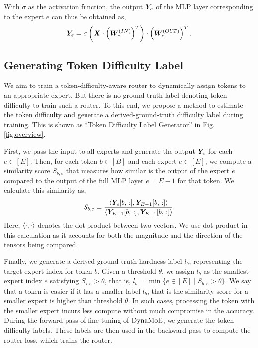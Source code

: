 With $\sigma$ as the activation function, the output $\bm{Y}_e$ of the MLP layer corresponding to the expert $e$ can thus be obtained as, 
\begin{equation}\label{eq:expert}
    \bm{Y}_e = \sigma \left(  \bm{X} \cdot \left(  \bm{W}^{(IN)}_e \right)^T   \right) \cdot \left(  \bm{W}^{(OUT)}_e \right)^T.
\end{equation}





\subsection{Generating Token Difficulty Label}\label{subsec:generate_gt_label}


We aim to train a token-difficulty-aware router to dynamically assign tokens to an appropriate expert. But there is no ground-truth label denoting token difficulty to train such a router. To this end, we propose a method to estimate the token difficulty and generate a derived-ground-truth difficulty label during training. This is shown  as ``Token Difficulty Label Generator'' in Fig. \ref{fig:overview}. 

First, we pass the input to all experts and generate the output $\bm{Y}_e$ for each $e \in [E]$. Then, for each token $b \in [B]$ and each expert $e \in [E]$, we compute a similarity score $S_{b,e}$ that measures how similar is the output of the expert $e$ compared to the output of the full MLP layer $e={E-1}$ for that token. We calculate this similarity as,
\begin{equation}
    S_{b,e} = \frac{\left< \bm{Y}_e[b,\,:], \bm{Y}_{E-1}[b,\,:] \right>}{\left< \bm{Y}_{E-1}[b,\,:], \bm{Y}_{E-1}[b,\,:] \right>}.
\end{equation}
Here, $\left< \cdot, \cdot \right>$ denotes the dot-product between two vectors. We use dot-product in this calculation as it accounts for both the magnitude and the direction of the tensors being compared.

Finally, we generate a derived ground-truth hardness label $l_b$, representing the target expert index for token $b$. Given a threshold $\theta$, we assign $l_b$ as the smallest expert index $e$ satisfying $S_{b,e} > \theta$, that is, $l_b=\min\{e \in [E] \mid S_{b,e}>\theta\}$. We say that a token is easier if it has a smaller label $l_b$, that is the similarity score for a smaller expert is higher than threshold $\theta$. In such cases, processing the token with the smaller expert incurs less compute without much compromise in the accuracy. During the forward pass of fine-tuning of $\operatorname{DynaMoE}$, we generate the token difficulty labels. These labels are then used in the backward pass to compute the router loss, which trains the router.

